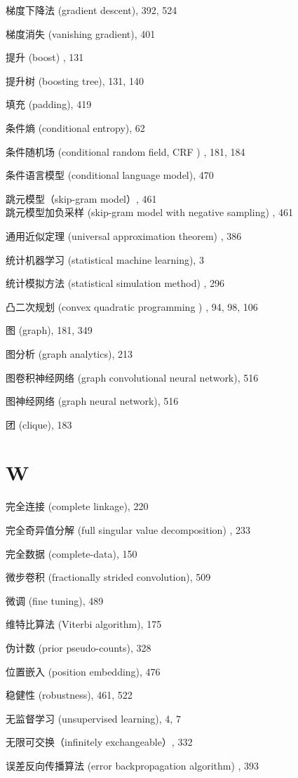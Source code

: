 \documentclass[10pt]{article}
\begin{document}
梯度下降法 (gradient descent), 392, 524

梯度消失 (vanishing gradient), 401

提升 (boost) , 131

提升树 (boosting tree), 131, 140

填充 (padding), 419

条件熵 (conditional entropy), 62

条件随机场 (conditional random field, CRF ) , 181, 184

条件语言模型 (conditional language model), 470

跳元模型（skip-gram model）, 461\\
跳元模型加负采样 (skip-gram model with negative sampling) , 461

通用近似定理 (universal approximation theorem) , 386

统计机器学习 (statistical machine learning), 3

统计模拟方法 (statistical simulation method) , 296

凸二次规划 (convex quadratic programming ) , 94, 98, 106

图 (graph), 181, 349

图分析 (graph analytics), 213

图卷积神经网络 (graph convolutional neural network), 516

图神经网络 (graph neural network), 516

团 (clique), 183

\section*{W}
完全连接 (complete linkage), 220

完全奇异值分解 (full singular value decomposition) , 233

完全数据 (complete-data), 150

微步卷积 (fractionally strided convolution), 509

微调 (fine tuning), 489

维特比算法 (Viterbi algorithm), 175

伪计数 (prior pseudo-counts), 328

位置嵌入 (position embedding), 476

稳健性 (robustness), 461, 522

无监督学习 (unsupervised learning), 4, 7

无限可交换（infinitely exchangeable）, 332

误差反向传播算法 (error backpropagation algorithm) , 393
\end{document}
